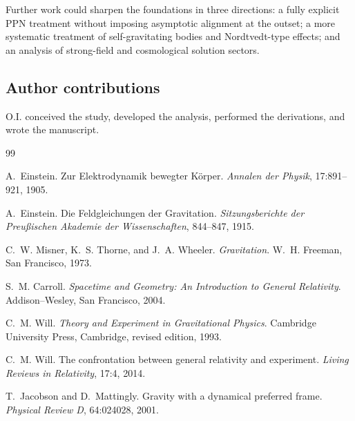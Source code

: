 \documentclass[12pt,a4paper]{article}
\begin{document}
        Further work could sharpen the foundations in three directions: a fully explicit
        PPN treatment without imposing asymptotic alignment at the outset; a more
        systematic treatment of self-gravitating bodies and Nordtvedt-type effects; and
        an analysis of strong-field and cosmological solution sectors.
        
        
        \subsection*{Author contributions}
            O.I. conceived the study, developed the analysis, performed the derivations, and wrote the manuscript.
        
    \begin{thebibliography}{99}

        A.~Einstein.
        \newblock Zur Elektrodynamik bewegter K\"orper.
        \newblock \emph{Annalen der Physik}, 17:891--921, 1905.
        \newblock {}
        
        A.~Einstein.
        \newblock Die Feldgleichungen der Gravitation.
        \newblock \emph{Sitzungsberichte der Preu\ss{}ischen Akademie der Wissenschaften},
        844--847, 1915.
        
        C.~W. Misner, K.~S. Thorne, and J.~A. Wheeler.
        \newblock \emph{Gravitation}.
        \newblock W.~H. Freeman, San Francisco, 1973.
        
        S.~M. Carroll.
        \newblock \emph{Spacetime and Geometry: An Introduction to General Relativity}.
        \newblock Addison--Wesley, San Francisco, 2004.
        
        C.~M. Will.
        \newblock \emph{Theory and Experiment in Gravitational Physics}.
        \newblock Cambridge University Press, Cambridge, revised edition, 1993.
        
        C.~M. Will.
        \newblock The confrontation between general relativity and experiment.
        \newblock \emph{Living Reviews in Relativity}, 17:4, 2014.
        \newblock {}
        
        T.~Jacobson and D.~Mattingly.
        \newblock Gravity with a dynamical preferred frame.
        \newblock \emph{Physical Review D}, 64:024028, 2001.
        \newblock {}
        

\end{thebibliography}
\end{document}
